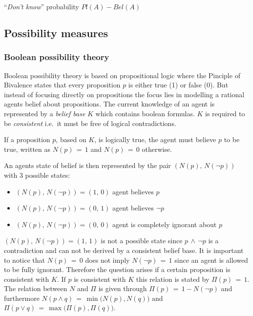 \documentclass[
]{report}
\theoremstyle{definition}
\begin{document}
``\textit{Don't know}'' probability \(Pl(A) - Bel(A)\)

\subsection{Possibility measures}

\subsubsection{Boolean possibility theory}

Boolean possibility theory is based on propositional logic where the
Pinciple of Bivalence states that every proposition \(p\) is either true
(1) or false (0). But instead of focusing directly on propositions the
focus lies in modelling a rational agents belief about propositions. The
current knowledge of an agent is represented by a \textit{belief base}
\(K\) which contains boolean formulas. \(K\) is required to be
\textit{consistent} i.e.~it must be free of logical contradictions.

If a proposition \(p\), based on \(K\), is logically true, the agent
must believe \(p\) to be true, written as \(N(p) \, = \, 1\) and
\(N(p) \, = \, 0\) otherwise.

An agents state of belief is then represented by the pair
\((N(p), \, N(\lnot p))\) with 3 possible states:

\begin{itemize}
  \item $(N(p), \, N(\lnot p)) = (1, \, 0)$ agent believes $p$
  \item $(N(p), \, N(\lnot p)) = (0, \, 1)$ agent believes $\lnot p$
  \item $(N(p), \, N(\lnot p)) = (0, \, 0)$ agent is completely ignorant about $p$
\end{itemize}

\((N(p), \, N(\lnot p)) = (1, \, 1)\) is not a possible state since
\(p \, \land \, \lnot p\) is a contradiction and can not be derived by a
consistent belief base. It is important to notice that
\(N(p) \, = \, 0\) does not imply \(N( \lnot p) \, = \, 1\) since an
agent is allowed to be fully ignorant. Therefore the question arises if
a certain proposition is consistent with \(K\). If \(p\) is consistent
with \(K\) this relation is stated by \(\Pi (p) \, = \, 1\). The
relation between \(N\) and \(\Pi\) is given through
\(\Pi (p) \, = \, 1 - N(\lnot p)\) and furthermore
\(N (p \land q) \, = \, \min \big( N(p), N(q) \big)\) and
\(\Pi (p \lor q) \, = \, \max \big( \Pi(p), \Pi(q) \big)\).
\end{document}
